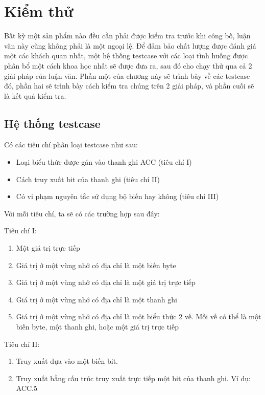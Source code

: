 \chapter{Kiểm thử}

Bất kỳ một sản phẩm nào đều cần phải được kiểm tra trước khi công bố, luận văn này cũng không phải là một ngoại lệ. Để đảm bảo chất lượng được đánh giá một các khách quan nhất, một hệ thống testcase với các loại tình huống được phân bổ một cách khoa học nhất sẽ được đưa ra, sau đó cho chạy thử qua cả 2 giải pháp của luận văn. Phần một của chương này sẽ trình bày về các testcase đó, phần hai sẽ trình bày cách kiểm tra chúng trên 2 giải pháp, và phần cuối sẽ là kết quả kiểm tra.

\section{Hệ thống testcase}
Có các tiêu chí phân loại testcase như sau:
\begin{itemize}
	\item Loại biểu thức được gán vào thanh ghi ACC (tiêu chí I)
	\item Cách truy xuất bit của thanh ghi (tiêu chí II)
	\item Có vi phạm nguyên tắc sử dụng bộ biến hay không (tiêu chí III)
\end{itemize}
Với mỗi tiêu chí, ta sẽ có các trường hợp sau đây:

Tiêu chí I:
\begin{enumerate}
	\item Một giá trị trực tiếp
	\item Giá trị ở một vùng nhớ có địa chỉ là một biến byte
	\item Giá trị ở một vùng nhớ có địa chỉ là một giá trị trực tiếp
	\item Giá trị ở một vùng nhớ có địa chỉ là một thanh ghi
	\item Giá trị ở một vùng nhớ có địa chỉ là một biểu thức 2 vế. Mỗi vế có thể là một biến byte, một thanh ghi, hoặc một giá trị trực tiếp
\end{enumerate}

Tiêu chí II:
\begin{enumerate}
	\item Truy xuất dựa vào một biến bit.
	\item Truy xuất bằng cấu trúc truy xuất trực tiếp một bit của thanh ghi. Ví dụ: ACC.5
\end{enumerate}

